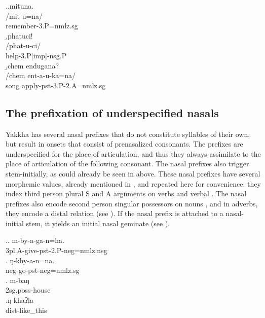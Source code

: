 			\ex.\a.\glll mituna.\\
			/mit-u=na/\\
			remember{\sc [pst]-3.P=nmlz.sg}\\
			\b.\glll  phatuci!\\
			/phat-u-ci/\\
			help{\sc -3.P[imp]-nsg.P}\\
			\b.\glll chem endugana?\\
			/chem ent-a-u-ka=na/\\
			song apply{\sc -pst-3.P-2.A=nmlz.sg}\\
	 
	 
\subsection{The prefixation of underspecified nasals}\label{nas-pref}		 
		 
Yakkha has several nasal prefixes that do not constitute  syllables of their own, but result in onsets that consist of prenasalized consonants. The prefixes are underspecified for the place of articulation, and thus they always assimilate to the place of articulation of the following consonant. The nasal prefixes also trigger  stem-initially, as could already be seen in  above. These nasal prefixes have several morphemic values, already mentioned in , and repeated here for convenience: they index third person plural S and A arguments on verbs \Next[a] and verbal  \Next[b]. The nasal prefixes also encode second person singular possessors on nouns \Next[c], and in adverbs, they encode a distal relation (see \Next[d]). If the nasal prefix is attached to a nasal-initial stem, it yields an initial nasal geminate (see \NNext).
 
			
\ex.\ag.	m-by-a-ga-n=ha.\\
			{\sc 3pl.A-}give{\sc -pst-2.P-neg=nmlz.nsg}\\
			\bg. ŋ-khy-a-n=na.\\
			{\sc neg-}go{\sc [3sg]-pst-neg=nmlz.sg}\\
			\bg.	m-baŋ\\
			{\sc 2sg.poss-}house\\
			\bg.ŋ-khaʔla\\
			{\sc dist-}like\_this\\
			
